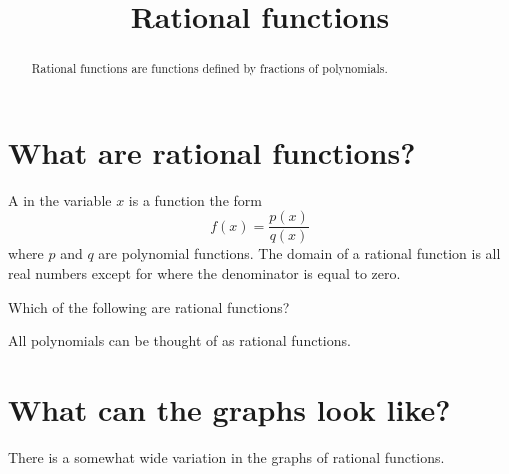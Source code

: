 \documentclass{ximera}
\title[Dig-In:]{Rational functions}
\begin{document}
\begin{abstract}
  Rational functions are functions defined by fractions of
  polynomials.
\end{abstract}
\maketitle


\section{What are rational functions?}

\begin{definition}
  A  in the variable $x$ is a function the form
  \[
  f(x) = \frac{p(x)}{q(x)}
  \]
  where $p$ and $q$ are polynomial functions. The domain of a rational
  function is all real numbers except for where the denominator is
  equal to zero.
\end{definition}

\begin{question}
  Which of the following are rational functions?
  \begin{selectAll}
  \end{selectAll}
  \begin{feedback}
    All polynomials can be thought of as rational functions.
  \end{feedback}
\end{question}



\section{What can the graphs look like?}

There is a somewhat wide variation in the graphs of rational
functions.
\end{document}
